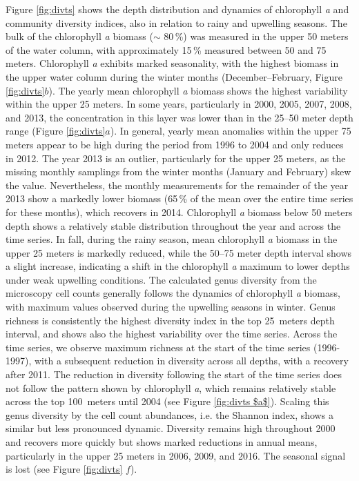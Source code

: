 \documentclass[draft]{agujournal2019}
\begin{document}
Figure \ref{fig:divts} shows the depth distribution and dynamics of chlorophyll \textit{a} and community diversity indices, also in relation to rainy and upwelling seasons. The bulk of the chlorophyll \textit{a} biomass ($\sim$ 80\,\%) was measured in the upper 50 meters of the water column, with approximately 15\,\% measured between 50 and 75 meters. Chlorophyll \textit{a} exhibits marked seasonality, with the highest biomass in the upper water column during the winter months (December–February, Figure \ref{fig:divts}$b$). The yearly mean chlorophyll \textit{a} biomass shows the highest variability within the upper 25 meters. In some years, particularly in 2000, 2005, 2007, 2008, and 2013, the concentration in this layer was lower than in the 25–50 meter depth range (Figure \ref{fig:divts}$a$). In general, yearly mean anomalies within the upper 75 meters appear to be high during the period from 1996 to 2004 and only reduces in 2012. The year 2013 is an outlier, particularly for the upper 25 meters, as the missing monthly samplings from the winter months (January and February) skew the value. Nevertheless, the monthly measurements for the remainder of the year 2013 show a markedly lower biomass (65\,\% of the mean over the entire time series for these months), which recovers in 2014. Chlorophyll \textit{a} biomass below 50 meters depth shows a relatively stable distribution throughout the year and across the time series. In fall, during the rainy season, mean chlorophyll \textit{a} biomass in the upper 25 meters is markedly reduced, while the 50–75 meter depth interval shows a slight increase, indicating a shift in the chlorophyll \textit{a} maximum to lower depths under weak upwelling conditions.
The calculated genus diversity from the microscopy cell counts generally follows the dynamics of chlorophyll \textit{a} biomass, with maximum values observed during the upwelling seasons in winter. Genus richness is consistently the highest diversity index in the top \qty{25}{meters} depth interval, and shows also the highest variability over the time series. Across the time series, we observe maximum richness at the start of the time series (1996-1997), with a subsequent reduction in diversity across all depths, with a recovery after 2011. The  reduction in diversity following the start of the time series does not follow the pattern shown by chlorophyll \textit{a}, which remains relatively stable across the top \qty{100}{meters} until 2004 (see Figure \ref{fig:divts $a$}). Scaling this genus diversity by the cell count abundances, i.e. the Shannon index, shows a similar but less pronounced dynamic. Diversity remains high throughout 2000 and recovers more quickly but shows marked reductions in annual means, particularly in the upper 25 meters in 2006, 2009, and 2016. The seasonal signal is lost (see Figure \ref{fig:divts} $f$). 
\end{document}
